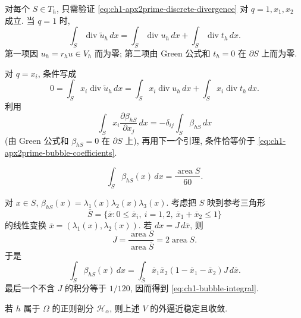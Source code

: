 \begin{Proof}
对每个 $S\in T_h$, 只需验证 \eqref{eq:ch1-apx2prime-discrete-divergence} 对 $q=1,x_1,x_2$ 成立. 当 $q=1$ 时,
\[
\int_S\operatorname{div}\widetilde u_h\,dx
=\int_S\operatorname{div}u_h\,dx+\int_S\operatorname{div}t_h\,dx.
\]
第一项因 $u_h=r_hu\in V_h$ 而为零; 第二项由 Green 公式和 $t_h=0$ 在 $\partial S$ 上而为零.

对 $q=x_i$, 条件写成
\begin{equation}
0=\int_Sx_i\operatorname{div}\widetilde u_h\,dx
=\int_Sx_i\operatorname{div}u_h\,dx
+\int_Sx_i\operatorname{div}t_h\,dx.
\label{eq:ch1-apx2prime-linear-moment-condition}
\end{equation}
利用
\[
\int_Sx_i\frac{\partial\beta_{hS}}{\partial x_j}\,dx
=-\delta_{ij}\int_S\beta_{hS}\,dx
\]
(由 Green 公式和 $\beta_{hS}=0$ 在 $\partial S$ 上), 再用下一个引理, 条件恰等价于 \eqref{eq:ch1-apx2prime-bubble-coefficients}.
\end{Proof}

\begin{Lemma}
\label{lem:ch1-bubble-integral}
\begin{equation}
\int_S\beta_{hS}(x)\,dx
=\frac{\operatorname{area}S}{60}.
\label{eq:ch1-bubble-integral}
\end{equation}
\end{Lemma}

\begin{Proof}
对 $x\in S$, $\beta_{hS}(x)=\lambda_1(x)\lambda_2(x)\lambda_3(x)$. 考虑把 $S$ 映到参考三角形
\[
\overline S=\{\overline x:0\leq\overline x_i,\ i=1,2,\ 
\overline x_1+\overline x_2\leq1\}
\]
的线性变换 $\overline x=(\lambda_1(x),\lambda_2(x))$. 若 $dx=J\,d\overline x$, 则
\[
J=\frac{\operatorname{area}S}{\operatorname{area}\overline S}
=2\operatorname{area}S.
\]
于是
\[
\int_S\beta_{hS}(x)\,dx
=\int_{\overline S}\overline x_1\overline x_2
(1-\overline x_1-\overline x_2)J\,d\overline x.
\]
最后一个不含 $J$ 的积分等于 $1/120$, 因而得到 \eqref{eq:ch1-bubble-integral}.
\end{Proof}

\begin{Proposition}
\label{prop:ch1-apx2prime-stable-convergent}
若 $h$ 属于 $\Omega$ 的正则剖分 $\mathcal H_\alpha$, 则上述 $V$ 的外逼近稳定且收敛.
\end{Proposition}


